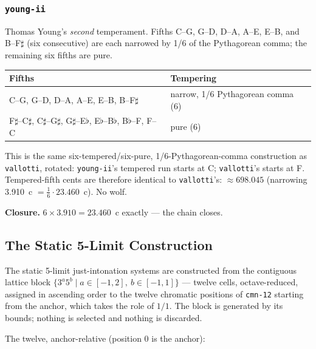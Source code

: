 \documentclass[11pt,letterpaper]{report}
\newcounter{requirement}[chapter]
\begin{document}
\subsubsection{\texttt{young-ii}}

Thomas Young's \emph{second} temperament. Fifths C--G, G--D, D--A, A--E,
E--B, and B--F$\sharp$ (six consecutive) are each narrowed by 1/6 of the
Pythagorean comma; the remaining six fifths are pure.

\begin{longtable}{p{9.5cm} p{2.5cm}}
  \toprule
  \textbf{Fifths} & \textbf{Tempering} \\
  \midrule
  \endhead
  C--G, G--D, D--A, A--E, E--B, B--F$\sharp$ &
    narrow, 1/6 Pythagorean comma (6) \\
  F$\sharp$--C$\sharp$, C$\sharp$--G$\sharp$, G$\sharp$--E$\flat$,
    E$\flat$--B$\flat$, B$\flat$--F, F--C & pure (6) \\
  \bottomrule
\end{longtable}

This is the same six-tempered/six-pure, 1/6-Pythagorean-comma
construction as \texttt{vallotti}, rotated: \texttt{young-ii}'s
tempered run starts at C; \texttt{vallotti}'s starts at F. Tempered-fifth
cents are therefore identical to \texttt{vallotti}'s: $\approx 698.045$
(narrowing 3.910~c $= \tfrac{1}{6} \cdot 23.460$~c). No wolf.

\textbf{Closure.} $6 \times 3.910 = 23.460$~c exactly --- the chain
closes.

\subsection{The Static 5-Limit Construction}
\label{sec:tuning:ji-static}

\begin{requirement}
  \label{req:tuning:ji-static-construction}
  The static 5-limit just-intonation systems are constructed from the
  contiguous lattice block $\{3^a 5^b \mid a \in [-1,2],\ b \in
  [-1,1]\}$ --- twelve cells, octave-reduced, assigned in ascending
  order to the twelve chromatic positions of \texttt{cmn-12} starting
  from the anchor, which takes the role of $1/1$. The block is
  generated by its bounds; nothing is selected and nothing is
  discarded.
\end{requirement}

The twelve, anchor-relative (position 0 is the anchor):
\end{document}
